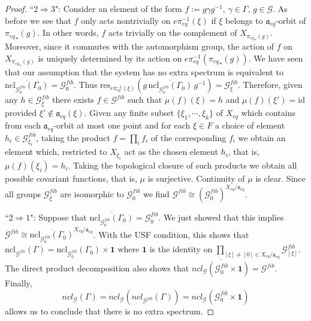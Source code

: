 \documentclass[10pt,a4paper]{amsart}
\numberwithin{equation}{section}
\newcommand{\tcr}{\textcolor{red}}
\newcommand{\Gg}{{\mathcal G}}
\newcommand{\id}{{\mathbf 1}}
\newcommand{\Xe}{X_{eq}}
\newcommand{\aut}{{\mathfrak a}}
\newcommand{\aute}{\aut_{eq}}
\newcommand{\Xmax}{\Xe}
\newcommand{\pe}{\pi_{eq}}
\newcommand{\res}{\mathrm{res}}
\begin{document}
\begin{proof}
``$2 \Rightarrow 3$":      
Consider an element  of the form $f:=g\gamma g^{-1}$, $\gamma\in\Gamma$, $g\in \Gg$. As before we see that $f$ only acts nontrivially on $e\pe^{-1}(\xi)$ if $\xi$ belongs to  $\aute$-orbit of ${\pe}_*(g)$. In other words, $f$ acts trivially on the complement of $X_{{\pe}_*(g)}$. Moreover, since it commutes with the automorphism group, the action of $f$ on $X_{{\pe}_*(g)}$ is uniquely determined by its action on $e\pe^{-1}({\pe}_*(g))$. We have seen that our assumption that the system has no extra spectrum is equivalent to  
$   \overline{   \text{ncl}_{ \Gg_0^{fib} }(\Gamma_0) }    = \Gg^{fib}_0$. 
Thus
$\res_{e\pe^{-1}(\xi) }(g   \,   \overline{\text{ncl}_{\Gg^{fib}_0}(\Gamma_0)}  \, g^{-1}) = \Gg^{fib}_\xi$. Therefore, given any $h\in \Gg^{fib}_\xi$ there exists $f\in\Gg^{fib}$ such that $\mu(f)(\xi) = h$ and   $\mu(f)(\xi') = \mathrm{id}$
provided $\xi'\notin\aute(\xi)$. Given any finite subset $\{\xi_1,\cdots,\xi_k\}$ of $\Xe$ which contains from each $\aute$-orbit at most one point and for each $\xi\in F$ a choice of element $h_i\in \Gg^{fib}_{\xi_i}$, taking the product $f=\prod_i f_i$ of the corresponding $f_i$ we obtain an element which, restricted to $X_{\xi_i}$ act as the chosen element $h_i$, that is, $\mu(f)(\xi_i) = h_i$. Taking the topological closure of such products we obtain all possible covariant functions, that is, $\mu$ is surjective. Continuity of $\mu$ is clear.
Since all groups $\Gg^{fib}_\xi$ are isomorphic to  $\Gg^{fib}_0$
we find  $\Gg^{fib} \cong  (\Gg^{fib}_0)^{\Xe/\aute}$.

``$2  \Rightarrow 1$":
Suppose that %
$  \overline{\text{ncl}_{\Gg^{fib}_0}(\Gamma_0)} =\Gg^{fib}_0$.
   We just showed that this implies $\Gg^{fib} \cong     \overline{   \text{ncl}_{ \Gg_0^{fib} }(\Gamma_0) }       ^{\Xe/\aute}$. With the USF condition, this shows that 
 $         \text{ncl}_{ \Gg^{fib} }(\Gamma) =  \text{ncl}_{ \Gg_0^{fib} }(\Gamma_0)        \times \id $                 where $\id$ is the identity on $\prod_{[\xi]\neq [0]\in \Xmax/\aute} \Gg^{fib}_{[\xi]}$. The direct product decomposition also shows that 
$\overline{ncl_\Gg(\Gg^{fib}_0\times\id)}=\Gg^{fib}$. Finally, 
      $$ncl_\Gg  (\Gamma)=ncl_\Gg (ncl_{   \Gg^{fib}  }(\Gamma)) = ncl_{\Gg } (\Gg^{fib}_0\times\id)$$
allows us to conclude that there is no extra spectrum.
\end{proof}
\end{document}
